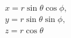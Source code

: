 \documentclass[preview]{standalone}
\begin{document}
\begin{align*}
x = r \sin\theta \cos\phi, \\ y = r \sin\theta \sin\phi, \\ z = r \cos\theta
\end{align*}
\end{document}
